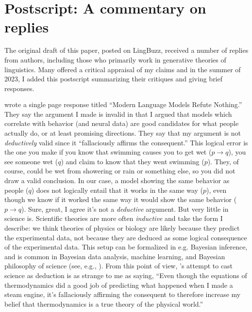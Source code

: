 \documentclass[output=paper,colorlinks,citecolor=brown
]{langscibook}
\begin{document}
\section*{Postscript: A commentary on replies}

The original draft of this paper, posted on LingBuzz, received a number of replies from authors, including those who primarily work in generative theories of linguistics. Many offered a critical appraisal of my claims and in the summer of 2023, I added this postscript  summarizing their critiques and giving brief responses.

\cite{rawski2023modern} wrote a single page response titled ``Modern Language Models Refute Nothing.'' They say the argument I made is invalid in that I argued that models which correlate with behavior (and neural data) are good candidates for what people actually do, or at least promising directions. They say that my argument is not \emph{deductively} valid since it ``fallaciously affirms the consequent.'' This logical error is the one you make if you know that swimming causes you to get wet ($p \to q$), you see someone wet ($q$) and claim to know that they went swimming ($p$). They, of course, could be wet from showering or rain or something else, so you did not draw a valid conclusion. In our case, a model showing the same behavior as people ($q$) does not logically entail that it works in the same way ($p$), even though we know if it worked the same way it would show the same behavior ($p \to q$). Sure, great, I agree it's not a \emph{deductive} argument. But very little in science is. Scientific theories are more often \emph{inductive} and take the form I describe: we think theories of physics or biology are likely because they predict the experimental data, not because they are deduced as some logical consequence of the experimental data. This setup can be formalized in e.g. Bayesian inference, and is common in Bayesian data analysis, machine learning, and Bayesian philosophy of science (see, e.g., \cite{jeffreys1998theory,godfrey2009theory}). From this point of view, \cite{rawski2023modern}'s attempt to cast science as deduction is as strange to me as saying, ``Even though the equations of thermodynamics did a good job of predicting what happened when I made a steam engine, it's fallaciously affirming the consequent to therefore increase my belief that thermodynamics is a true theory of the physical world.'' 
\end{document}
